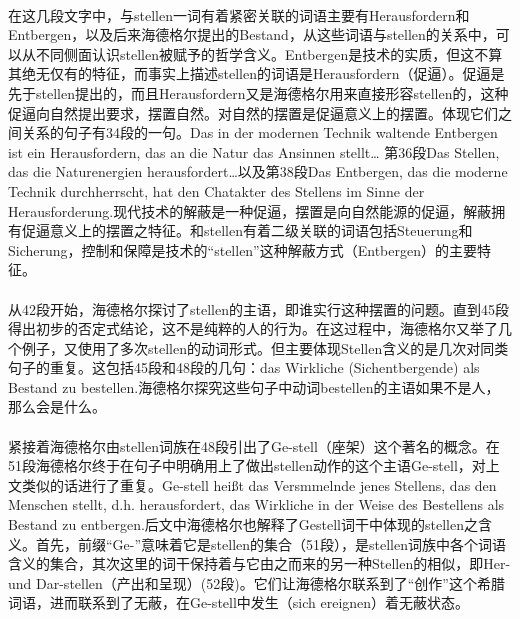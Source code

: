 \documentclass{article}
\begin{document}
			\paragraph{}
		在这几段文字中，与stellen一词有着紧密关联的词语主要有Herausfordern和Entbergen，以及后来海德格尔提出的Bestand，从这些词语与stellen的关系中，可以从不同侧面认识stellen被赋予的哲学含义。Entbergen是技术的实质，但这不算其绝无仅有的特征，而事实上描述stellen的词语是Herausfordern（促逼）。促逼是先于stellen提出的，而且Herausfordern又是海德格尔用来直接形容stellen的，这种促逼向自然提出要求，摆置自然。对自然的摆置是促逼意义上的摆置。体现它们之间关系的句子有34段的一句。Das in der modernen Technik waltende Entbergen ist ein Herausfordern, das an die Natur das Ansinnen stellt… 第36段Das Stellen, das die Naturenergien herausfordert…以及第38段Das Entbergen, das die moderne Technik durchherrscht, hat den Chatakter des Stellens im Sinne der Herausforderung.现代技术的解蔽是一种促逼，摆置是向自然能源的促逼，解蔽拥有促逼意义上的摆置之特征。和stellen有着二级关联的词语包括Steuerung和Sicherung，控制和保障是技术的“stellen”这种解蔽方式（Entbergen）的主要特征。
			\paragraph{}
		从42段开始，海德格尔探讨了stellen的主语，即谁实行这种摆置的问题。直到45段得出初步的否定式结论，这不是纯粹的人的行为。在这过程中，海德格尔又举了几个例子，又使用了多次stellen的动词形式。但主要体现Stellen含义的是几次对同类句子的重复。这包括45段和48段的几句：das Wirkliche (Sichentbergende) als Bestand zu bestellen.海德格尔探究这些句子中动词bestellen的主语如果不是人，那么会是什么。
			\paragraph{}
		紧接着海德格尔由stellen词族在48段引出了Ge-stell（座架）这个著名的概念。在51段海德格尔终于在句子中明确用上了做出stellen动作的这个主语Ge-stell，对上文类似的话进行了重复。Ge-stell heißt das Versmmelnde jenes Stellens, das den Menschen stellt, d.h. herausfordert, das Wirkliche in der Weise des Bestellens als Bestand zu entbergen.后文中海德格尔也解释了Gestell词干中体现的stellen之含义。首先，前缀“Ge-”意味着它是stellen的集合（51段），是stellen词族中各个词语含义的集合，其次这里的词干保持着与它由之而来的另一种Stellen的相似，即Her- und Dar-stellen（产出和呈现）(52段)。它们让海德格尔联系到了“创作”这个希腊词语，进而联系到了无蔽，在Ge-stell中发生（sich ereignen）着无蔽状态。	
		
\end{document}
